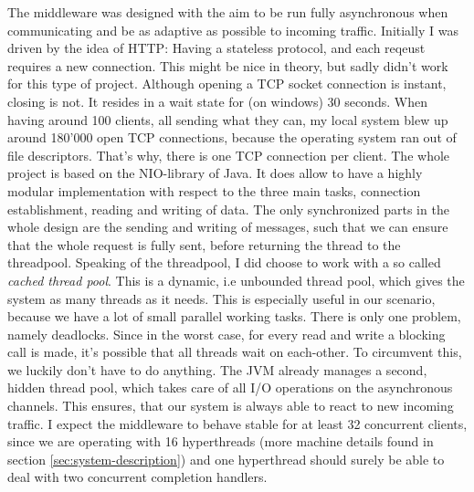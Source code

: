 \documentclass[11pt]{article}
\begin{document}
The middleware was designed with the aim to be run fully asynchronous when communicating and be as adaptive as possible to incoming traffic. Initially I was driven by the idea of HTTP: Having a stateless protocol, and each reqeust requires a new connection. This might be nice in theory, but sadly didn't work for this type of project. Although opening a TCP socket connection is instant, closing is not. It resides in a wait state for (on windows) 30 seconds. When having around 100 clients, all sending what they can, my local system blew up around 180'000 open TCP connections, because the operating system ran out of file descriptors. That's why, there is one TCP connection per client. The whole project is based on the NIO-library of Java. It does allow to have a highly modular implementation with respect to the three main tasks, connection establishment, reading and writing of data. The only synchronized parts in the whole design are the sending and writing of messages, such that we can ensure that the whole request is fully sent, before returning the thread to the threadpool. Speaking of the threadpool, I did choose to work with a so called \textit{cached thread pool}. This is a dynamic, i.e unbounded thread pool, which gives the system as many threads as it needs. This is especially useful in our scenario, because we have a lot of small parallel working tasks. There is only one problem, namely deadlocks. Since in the worst case, for every read and write a blocking call is made, it's possible that all threads wait on each-other. To circumvent this, we luckily don't have to do anything. The JVM already manages a second, hidden thread pool, which takes care of all I/O operations on the asynchronous channels. This ensures, that our system is always able to react to new incoming traffic. I expect the middleware to behave stable for at least 32 concurrent clients, since we are operating with 16 hyperthreads (more machine details found in section \ref{sec:system-description}) and one hyperthread should surely be able to deal with two concurrent completion handlers.
\end{document}

